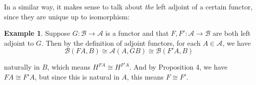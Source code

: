 \documentclass[11pt]{article}
\theoremstyle{definition}
\theoremstyle{definition}
\newtheorem{ex}{Example}
\theoremstyle{plain}
\theoremstyle{plain}
\theoremstyle{plain}
\begin{document}
In a similar way, it makes sense to talk about \emph{the} left adjoint of a certain functor, since they are unique up to isomorphism:

\begin{ex}
Suppose $G: \mathscr{B} \to \mathscr{A}$ is a functor and that $F, F': \mathscr{A} \to \mathscr{B}$ are both left adjoint to $G$. Then by the definition of adjoint functors, for each $A \in \mathscr{A}$, we have
\begin{equation*}
\mathscr{B}(FA, B) \cong \mathscr{A}(A, GB) \cong \mathscr{B}(F'A, B)
\end{equation*}

naturally in $B$, which means $H^{FA} \cong H^{F'A}$. And by Proposition 4, we have $FA \cong F'A$, but since this is natural in $A$, this means $F \cong F'$.
\end{ex}

\nocite{*}


\end{document}
